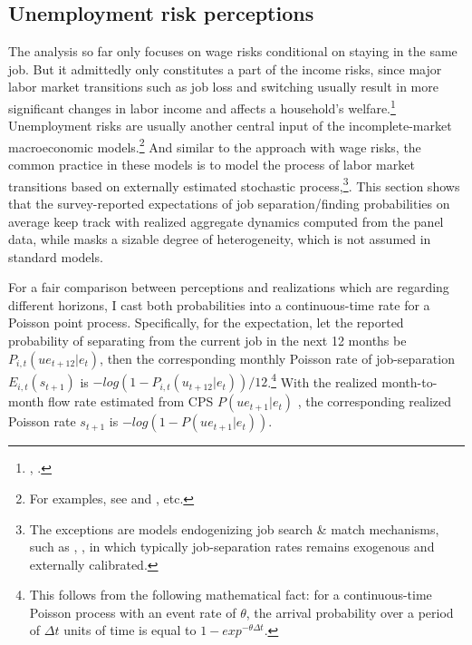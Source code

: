 \hypertarget{unemployment-risk-perceptions}{%
\subsection{Unemployment risk perceptions}\label{unemployment-risk-perceptions}}

The analysis so far only focuses on wage risks conditional on staying in the same job. But it admittedly only constitutes a part of the income risks, since major labor market transitions such as job loss and switching usually result in more significant changes in labor income and affects a household's welfare.\footnote{\cite{low2010wage}, \cite{davis2011recessions}.} Unemployment risks are usually another central input of the incomplete-market macroeconomic models.\footnote{For examples, see \cite{krueger2016macroeconomics} and \cite{bayer2019precautionary}, etc.} And similar to the approach with wage risks, the common practice in these models is to model the process of labor market transitions based on externally estimated stochastic process,\footnote{The exceptions are models endogenizing job search \& match mechanisms, such as \cite{ravn2017job}, \cite{ravn2021macroeconomic}, \cite{mckay2017time} in which typically job-separation rates remains exogenous and externally calibrated.}. This section shows that the survey-reported expectations of job separation/finding probabilities on average keep track with realized aggregate dynamics computed from the panel data, while masks a sizable degree of heterogeneity, which is not assumed in standard models.  


For a fair comparison between perceptions and realizations which are regarding different horizons, I cast both probabilities into a continuous-time rate for a Poisson point process. Specifically, for the expectation, let the reported probability of separating from the current job in the next 12 months be $P_{i,t}(ue_{t+12}|e_t)$, then the corresponding monthly Poisson rate of job-separation $E_{i,t}(s_{t+1})$ is $- log(1-P_{i,t}(u_{t+12}|e_t))/12$.\footnote{This follows from the following mathematical fact: for a continuous-time Poisson process with an event rate of $\theta$, the arrival probability over a period of $\Delta t$ units of time is equal to $1-exp^{-\theta \Delta t}$.} With the realized month-to-month flow rate estimated from CPS $P(ue_{t+1}|e_t)$ , the corresponding realized Poisson rate  $s_{t+1}$ is $-log(1-P(ue_{t+1}|e_t))$. 


